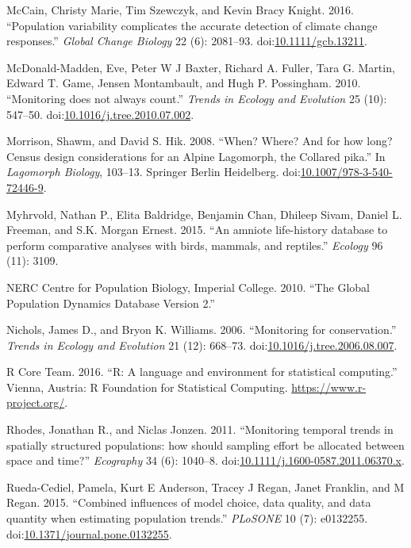 \documentclass[12pt,]{article}
\begin{document}
\hypertarget{ref-McCain2016}{}
McCain, Christy Marie, Tim Szewczyk, and Kevin Bracy Knight. 2016.
``Population variability complicates the accurate detection of climate
change responses.'' \emph{Global Change Biology} 22 (6): 2081--93.
doi:\href{https://doi.org/10.1111/gcb.13211}{10.1111/gcb.13211}.

\hypertarget{ref-McDonald-Madden2010}{}
McDonald-Madden, Eve, Peter W J Baxter, Richard A. Fuller, Tara G.
Martin, Edward T. Game, Jensen Montambault, and Hugh P. Possingham.
2010. ``Monitoring does not always count.'' \emph{Trends in Ecology and
Evolution} 25 (10): 547--50.
doi:\href{https://doi.org/10.1016/j.tree.2010.07.002}{10.1016/j.tree.2010.07.002}.

\hypertarget{ref-Morrison2008}{}
Morrison, Shawm, and David S. Hik. 2008. ``When? Where? And for how
long? Census design considerations for an Alpine Lagomorph, the Collared
pika.'' In \emph{Lagomorph Biology}, 103--13. Springer Berlin
Heidelberg.
doi:\href{https://doi.org/10.1007/978-3-540-72446-9}{10.1007/978-3-540-72446-9}.

\hypertarget{ref-Myhrvold2015}{}
Myhrvold, Nathan P., Elita Baldridge, Benjamin Chan, Dhileep Sivam,
Daniel L. Freeman, and S.K. Morgan Ernest. 2015. ``An amniote
life-history database to perform comparative analyses with birds,
mammals, and reptiles.'' \emph{Ecology} 96 (11): 3109.

\hypertarget{ref-GPDD2010}{}
NERC Centre for Population Biology, Imperial College. 2010. ``The Global
Population Dynamics Database Version 2.''

\hypertarget{ref-Nichols2006}{}
Nichols, James D., and Bryon K. Williams. 2006. ``Monitoring for
conservation.'' \emph{Trends in Ecology and Evolution} 21 (12): 668--73.
doi:\href{https://doi.org/10.1016/j.tree.2006.08.007}{10.1016/j.tree.2006.08.007}.

\hypertarget{ref-RCoreTeam2016}{}
R Core Team. 2016. ``R: A language and environment for statistical
computing.'' Vienna, Austria: R Foundation for Statistical Computing.
\url{https://www.r-project.org/}.

\hypertarget{ref-Rhodes2011}{}
Rhodes, Jonathan R., and Niclas Jonzen. 2011. ``Monitoring temporal
trends in spatially structured populations: how should sampling effort
be allocated between space and time?'' \emph{Ecography} 34 (6): 1040--8.
doi:\href{https://doi.org/10.1111/j.1600-0587.2011.06370.x}{10.1111/j.1600-0587.2011.06370.x}.

\hypertarget{ref-Rueda-Cediel2015}{}
Rueda-Cediel, Pamela, Kurt E Anderson, Tracey J Regan, Janet Franklin,
and M Regan. 2015. ``Combined influences of model choice, data quality,
and data quantity when estimating population trends.'' \emph{PLoSONE} 10
(7): e0132255.
doi:\href{https://doi.org/10.1371/journal.pone.0132255}{10.1371/journal.pone.0132255}.
\end{document}
